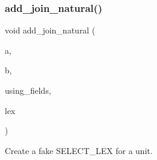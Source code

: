 \subsubsection{\texorpdfstring{add\+\_\+join\+\_\+natural()}{add\_join\_natural()}}
{\footnotesize\ttfamily void add\+\_\+join\+\_\+natural (\begin{DoxyParamCaption}\item[{\mbox{\hyperlink{structTABLE__LIST}{T\+A\+B\+L\+E\+\_\+\+L\+I\+ST}} $\ast$}]{a,  }\item[{\mbox{\hyperlink{structTABLE__LIST}{T\+A\+B\+L\+E\+\_\+\+L\+I\+ST}} $\ast$}]{b,  }\item[{\mbox{\hyperlink{classList}{List}}$<$ String $>$ $\ast$}]{using\+\_\+fields,  }\item[{S\+E\+L\+E\+C\+T\+\_\+\+L\+EX $\ast$}]{lex }\end{DoxyParamCaption})}

Create a fake S\+E\+L\+E\+C\+T\+\_\+\+L\+EX for a unit.

